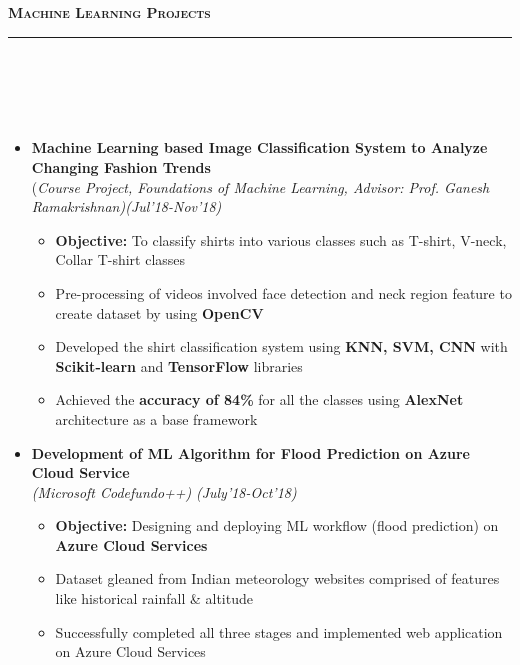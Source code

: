 \documentclass[a4paper,10pt]{article}
\newcommand{\isep}{-2 pt}
\newcommand{\lsep}{-0.5cm}
\newcommand{\resheading}[1]{{\small
        {
            \begin{minipage}
                {0.992\textwidth}\textbf{{\textsc{#1 \vphantom{p\^{E}} }}}
                \\[-0.3cm]
                \hrule
            \end{minipage}
            \\[-0.5cm]
        }
 }}
\begin{document}
\resheading{\textbf{\large Machine Learning Projects}}\\[\lsep]
\\[-0.2cm]
\begin{itemize}

\item \textbf{Machine Learning based Image Classification System to Analyze Changing Fashion Trends} \\(\emph{Course Project, Foundations of Machine Learning, Advisor: Prof. Ganesh Ramakrishnan)\hfill (Jul'18-Nov'18)}
    \\ [-0.6cm]
    \begin{itemize}\itemsep \isep
    \item \textbf{Objective:} To classify shirts into various classes such as T-shirt, V-neck, Collar T-shirt classes
    \item Pre-processing of videos involved face detection and neck region feature to create dataset by using \textbf{OpenCV}
    \item Developed the shirt classification system using \textbf{KNN, SVM, CNN} with \textbf{Scikit-learn} and \textbf{TensorFlow} libraries
    \item Achieved the \textbf{accuracy of 84\%} for all the classes using \textbf{AlexNet} architecture as a base framework
    \end{itemize}

\item \textbf{Development of ML Algorithm for Flood Prediction on Azure Cloud Service} \\
\emph{(Microsoft Codefundo++)} \hfill \emph{(July'18-Oct'18)}
    \\ [-0.6cm]
    \begin{itemize}\itemsep \isep
  \item \textbf{Objective:} Designing and deploying ML workflow (flood prediction) on \textbf{Azure Cloud Services}
    \item Dataset gleaned from Indian meteorology websites comprised of features like historical rainfall \& altitude
     \item Successfully completed all three stages and implemented web application on Azure Cloud Services
    \end{itemize}


\end{itemize}
\end{document}
